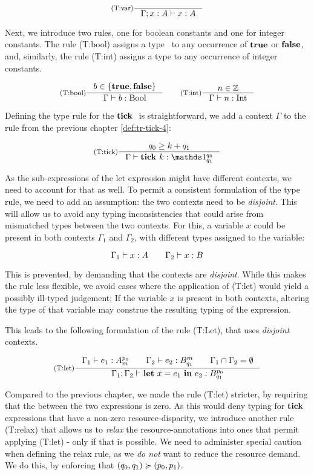 \[
   \inference[(T:var)]
   {}
   {\typing{\Gamma; x: A}{x}{A}}
\]

Next, we introduce two rules, one for boolean constants and one for integer constants. The rule (T:bool) assigns a type \bool~to any occurrence of \(\mathbf{true}\) or \(\mathbf{false}\), and, similarly, the rule (T:int) assigns a type \typeint to any occurrence of integer constants.

\[
   \inference[(T:bool)]
   {b \in \{\true, \false\}}
   {\typing{\Gamma}{b}{\text{\bool}}}%
   \qquad
   \inference[(T:int)]
   {n \in \mathbb{Z}}
   {\typing{\Gamma}{n}{\text{\typeint}}}
\]

Defining the type rule for the \(\mathbf{tick}~\) is straightforward, we add a context \(\Gamma\) to the rule from the previous chapter \cref{def:tr-tick-4}:

\[
   \inference[(T:tick)]
   {q_0 \geq k + q_1}
   {\typing{\Gamma}{\tick{k}}{\ratype{\unit}{q_0}{q_1}}}
\]

\begin{remark}
   As the sub-expressions of the let expression might have different contexts, we need to account for that as well. To permit a consistent formulation of the type rule, we need to add an assumption: the two contexts need to be \emph{disjoint}. This will allow us to avoid any typing inconsistencies that could arise from mismatched types between the two contexts. 
   For this, a variable \(x\) could be present in both contexts \(\Gamma_1\) and \(\Gamma_2\), with different types assigned to the variable:

   \[
      \Gamma_1 \vdash x : A \qquad \Gamma_2 \vdash x : B
   \]

   This is prevented, by demanding that the contexts are \emph{disjoint}. While this makes the rule less flexible, we avoid cases where the application of (T:let) would yield a possibly ill-typed judgement; If the variable \(x\) is present in both contexts, altering the type of that variable may construe the resulting typing of the expression.
\end{remark}

This leads to the following formulation of the rule (T:Let), that uses \emph{disjoint} contexts.

\[
   \inference[(T:let)]
   {\typing{\Gamma_1}{e_1}{\ratype{A}{p_0}{m}} \qquad \typing{\Gamma_2}{e_2}{\ratype{B}{m}{q_1}} \qquad \Gamma_1 \cap \Gamma_2 = \emptyset}
   {\typing{\Gamma_1; \Gamma_2}{\letexp{x}{e_1}{e_2}}{\ratype{B}{p_0}{q_1}}}
\]

Compared to the previous chapter, we made the rule (T:let) stricter, by requiring that the  between the two expressions is zero. As this would deny typing for \(\mathbf{tick}~\) expressions that have a non-zero resource-disparity, we introduce another rule (T:relax) that allows us to \emph{relax} the resource-annotations into ones that permit applying (T:let) - only if that is possible. 
We need to administer special caution when defining the relax rule, as we \emph{do not} want to reduce the resource demand. We do this, by enforcing that \((q_0, q_1) \succcurlyeq (p_0, p_1)\).

